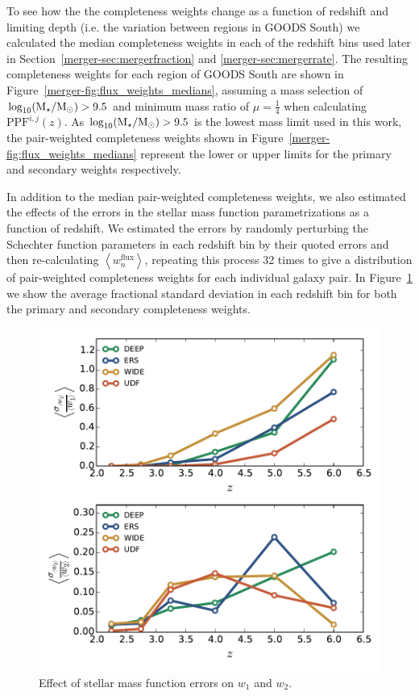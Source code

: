 To see how the the completeness weights change as a function of redshift and limiting depth (i.e. the variation between regions in GOODS South) we calculated the median completeness weights in each of the redshift bins used later in Section~\ref{merger-sec:mergerfraction} and \ref{merger-sec:mergerrate}. The resulting completeness weights for each region of GOODS South are shown in Figure~\ref{merger-fig:flux_weights_medians}, assuming a mass selection of $\log_{10}(\text{M}_{\star} / \text{M}_{\odot}) > 9.5$ and minimum mass ratio of $\mu = \frac{1}{4}$ when calculating $\text{PPF}^{i,j}(z)$. As $\log_{10}(\text{M}_{\star} / \text{M}_{\odot}) > 9.5$ is the lowest mass limit used in this work, the pair-weighted completeness weights shown in Figure~\ref{merger-fig:flux_weights_medians} represent the lower or upper limits for the primary and secondary weights respectively.

In addition to the median pair-weighted completeness weights, we also estimated the effects of the errors in the stellar mass function parametrizations as a function of redshift. We estimated the errors by randomly perturbing the Schechter function parameters in each redshift bin by their quoted errors and then re-calculating $\left \langle w^{\text{flux}}_{n} \right \rangle$, repeating this process 32 times to give a distribution of pair-weighted completeness weights for each individual galaxy pair. In Figure~\ref{merger-fig:flux_weights_errs} we show the average fractional standard deviation in each redshift bin for both the primary and secondary completeness weights.

\begin{figure}
\centering
	\includegraphics[width=0.85\columnwidth]{plots/flux_weight_MCtests.pdf}
  \caption[Effect of stellar mass function errors on $w_{1}$ and $w_{2}$.]{Effect of stellar mass function errors on $w_{1}$ and $w_{2}$.}
  \label{merger-fig:flux_weights_errs}
\end{figure}

